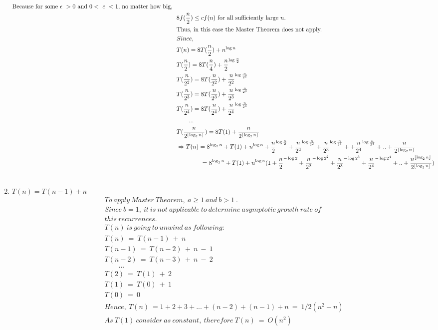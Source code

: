 \documentclass[a4paper]{scrartcl}
\begin{document}
\begin{enumerate}[label=(\alph*)]
\begin{align*}
   \text{Because for some }\epsilon\ >0\text{ and }0<\ c\ < 1\text{, no matter how big, }\\&\
   8f(\frac{n}{2})\leq cf(n)\text{ for all sufficiently large }n.\\ &\
   \text{Thus, in this case the Master Theorem does not apply.}\\ &\
   Since,\\ &\
   T(n) = 8T(\frac{n}{2})+n^{\log{n}}\\ &\
   T(\frac{n}{2})=8T(\frac{n}{4})+\frac{n}{2}^{\log{\frac{n}{2}}}\\ &\
   T(\frac{n}{2^2})=8T(\frac{n}{2^2})+\frac{n}{2^2}^{\log{\frac{n}{2^2}}}\\ &\
   T(\frac{n}{2^3})=8T(\frac{n}{2^3})+\frac{n}{2^3}^{\log{\frac{n}{2^3}}}\\ &\
   T(\frac{n}{2^4})=8T(\frac{n}{2^4})+\frac{n}{2^4}^{\log{\frac{n}{2^4}}}\\ &\
   \qquad ...\\ &\
   T(\frac{n}{2^{\left\lfloor \log_2{n} \right\rfloor}}) = 8T(1)+\frac{n}{2^{\left\lfloor \log_2{n} \right\rfloor}}\\ &\
   \Rightarrow T(n)=8^{\log_2{n}}+T(1)+ n^{\log{n}} + \frac{n}{2}^{\log{\frac{n}{2}}} + \frac{n}{2^2}^{\log{\frac{n}{2^2}}}+ \frac{n}{2^3}^{\log{\frac{n}{2^3}}}++ \frac{n}{2^4}^{\log{\frac{n}{2^4}}}+..+\frac{n}{2^{\left\lfloor \log_2{n} \right\rfloor}}\\ &\
   \qquad\qquad =8^{\log_2{n}} +T(1) + n^{\log{n}}(1+\frac{n}{2}^{-\log{2}}+\frac{n}{2^2}^{-\log{2^2}}+\frac{n}{2^3}^{-\log{2^3}}+\frac{n}{2^4}^{-\log{2^4}}+..+\frac{n^{\left\lfloor \log_2{n} \right\rfloor}}{2^{\left\lfloor \log_2{n} \right\rfloor}})\\ &\
\end{align*}
\item $T (n) = T (n - 1) + n$
\begin{align*}
  &\ To\ apply\ Master\ Theorem,\ a \geq 1\ and\ b > 1\ .\\ &\
  Since\ b = 1,\ it\ is\ not\ applicable\ to\ determine\ asymptotic\ growth\ rate\ of\\ &\
  this\ recurrences.\\ &\
  T(n)\ is\ going\ to\ unwind\ as\ following:\\ &\
  T(n)\ =\ T(n-1)\ +\ n\\ &\
  T(n-1)\ =\ T(n-2)\ +\ n\ -\ 1\\ &\
  T(n-2)\ =\ T(n-3)\ +\ n\ -\ 2\\ &\
  \qquad ...\\ &\
  T(2)\ =\ T(1)\ +\ 2\\ &\
  T(1)\ =\ T(0)\ +\ 1\\ &\
  T(0)\ =\ 0\\ &\
  Hence,\ T(n)\ = 1+2+3+...+(n-2)+(n-1)+n\ =\ 1/2(n^2+n)\\ &\
  As\ T(1)\ consider\ as\ constant,\ therefore\ T(n)\ =\ O(n^2)
\end{align*}
\end{enumerate}
\end{document}
